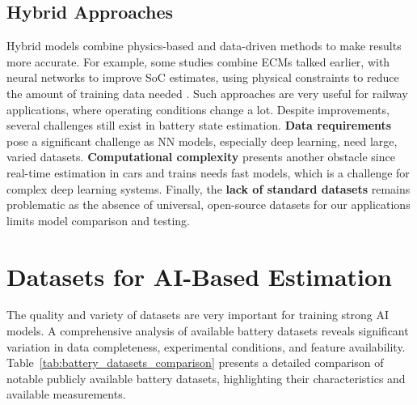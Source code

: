 \subsection{Hybrid Approaches}
Hybrid models combine physics-based and data-driven methods to make results more accurate. For example, some studies combine ECMs talked earlier, with neural networks to improve SoC estimates, using physical constraints to reduce the amount of training data needed \cite{dini_exploiting_2025}. Such approaches are very useful for railway applications, where operating conditions change a lot. Despite improvements, several challenges still exist in battery state estimation. \textbf{Data requirements} pose a significant challenge as NN models, especially deep learning, need large, varied datasets. \textbf{Computational complexity} presents another obstacle since real-time estimation in cars and trains needs fast models, which is a challenge for complex deep learning systems. Finally, the \textbf{lack of standard datasets} remains problematic as the absence of universal, open-source datasets for our applications limits model comparison and testing.


\section{Datasets for AI-Based Estimation}
\label{subsec:datasets}
The quality and variety of datasets are very important for training strong AI models. A comprehensive analysis of available battery datasets reveals significant variation in data completeness, experimental conditions, and feature availability. Table~\ref{tab:battery_datasets_comparison} presents a detailed comparison of notable publicly available battery datasets, highlighting their characteristics and available measurements.

